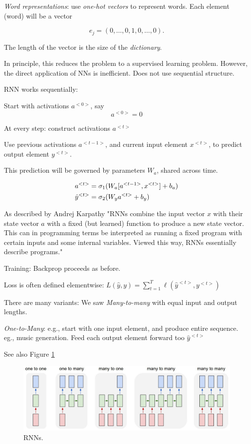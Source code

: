 \documentclass[english]{article}
\begin{document}
\item \emph{Word representations}: use \emph{one-hot vectors} to represent words. Each element (word) will be a vector 

$$e_j = (0,\ldots, 0, 1, 0,\ldots, 0).$$ 

The length of the vector is the size of the \emph{dictionary}.

In principle, this reduces the problem to a supervised learning problem. However, the direct application of NNs is inefficient. Does not use sequential structure. 

\item RNN works sequentially: 

\benum 
\item 
Start with activations $a^{<0>}$, say 
$$a^{<0>}=0$$
\item 
At every step: construct activations $a^{<t>}$

Use previous activations $a^{<t-1>}$, and current input element $x^{<t>}$, to predict output element $y^{<t>}$. 

This prediction will be governed by parameters $W_{a}$, shared across time. 

\begin{align*}
a^{<t>} &= \sigma_1(W_{a}[a^{<t-1>},x^{<t>}]+b_a)\\
\hat{y}^{<t>} &= \sigma_2(W_{y}a^{<t>}+b_y)
\end{align*}

As described by Andrej Karpathy "RNNs combine the input vector $x$ with their state vector $a$ with a fixed (but learned) function to produce a new state vector. This can in programming terms be interpreted as running a fixed program with certain inputs and some internal variables. Viewed this way, RNNs essentially describe programs."

\eenum 
\item Training: Backprop proceeds as before. 

Loss is often defined elementwise: $L(\hat y,y) = \sum_{t=1}^T \ell(\hat y^{<t>},y^{<t>})$


\item There are many variants: We saw \emph{Many-to-many} with equal input and output lengths. 

\emph{One-to-Many}: e.g., start with one input element, and produce entire sequence. eg., music generation. Feed each output element forward too $\hat y^{<t>}$

 See also Figure \ref{rnn}

\begin{figure}
  \centering
  \includegraphics[scale=0.3]{diags.jpeg}
  \caption{RNNs.}
  \label{rnn}
\end{figure}
\end{document}
